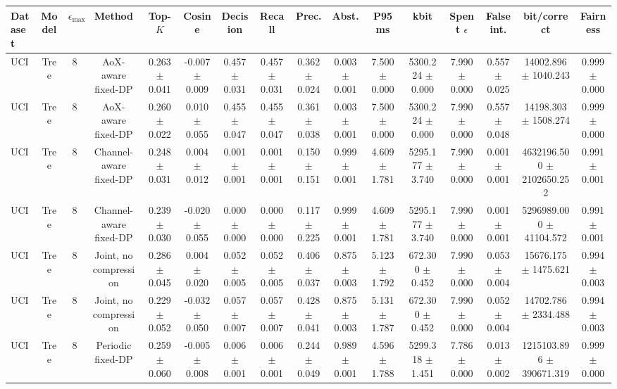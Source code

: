 \begin{tabular}{lccccccccccccccc}
\toprule
Dataset & Model & $\epsilon_{\max}$ & Method & Top-$K$ & Cosine & Decision & Recall & Prec. & Abst. & P95 ms & kbit & Spent $\epsilon$ & False int. & bit/correct & Fairness \\
\midrule
UCI & Tree & 8 & AoX-aware fixed-DP & 0.263 $\pm$ 0.041 & -0.007 $\pm$ 0.009 & 0.457 $\pm$ 0.031 & 0.457 $\pm$ 0.031 & 0.362 $\pm$ 0.024 & 0.003 $\pm$ 0.001 & 7.500 $\pm$ 0.000 & 5300.224 $\pm$ 0.000 & 7.990 $\pm$ 0.000 & 0.557 $\pm$ 0.025 & 14002.896 $\pm$ 1040.243 & 0.999 $\pm$ 0.000 \\
UCI & Tree & 8 & AoX-aware fixed-DP & 0.260 $\pm$ 0.022 & 0.010 $\pm$ 0.055 & 0.455 $\pm$ 0.047 & 0.455 $\pm$ 0.047 & 0.361 $\pm$ 0.038 & 0.003 $\pm$ 0.001 & 7.500 $\pm$ 0.000 & 5300.224 $\pm$ 0.000 & 7.990 $\pm$ 0.000 & 0.557 $\pm$ 0.048 & 14198.303 $\pm$ 1508.274 & 0.999 $\pm$ 0.000 \\
UCI & Tree & 8 & Channel-aware fixed-DP & 0.248 $\pm$ 0.031 & 0.004 $\pm$ 0.012 & 0.001 $\pm$ 0.001 & 0.001 $\pm$ 0.001 & 0.150 $\pm$ 0.151 & 0.999 $\pm$ 0.001 & 4.609 $\pm$ 1.781 & 5295.177 $\pm$ 3.740 & 7.990 $\pm$ 0.000 & 0.001 $\pm$ 0.001 & 4632196.500 $\pm$ 2102650.252 & 0.991 $\pm$ 0.001 \\
UCI & Tree & 8 & Channel-aware fixed-DP & 0.239 $\pm$ 0.030 & -0.020 $\pm$ 0.055 & 0.000 $\pm$ 0.000 & 0.000 $\pm$ 0.000 & 0.117 $\pm$ 0.225 & 0.999 $\pm$ 0.001 & 4.609 $\pm$ 1.781 & 5295.177 $\pm$ 3.740 & 7.990 $\pm$ 0.000 & 0.001 $\pm$ 0.001 & 5296989.000 $\pm$ 41104.572 & 0.991 $\pm$ 0.001 \\
UCI & Tree & 8 & Joint, no compression & 0.286 $\pm$ 0.045 & 0.004 $\pm$ 0.020 & 0.052 $\pm$ 0.005 & 0.052 $\pm$ 0.005 & 0.406 $\pm$ 0.037 & 0.875 $\pm$ 0.003 & 5.123 $\pm$ 1.792 & 672.300 $\pm$ 0.452 & 7.990 $\pm$ 0.000 & 0.053 $\pm$ 0.004 & 15676.175 $\pm$ 1475.621 & 0.994 $\pm$ 0.003 \\
UCI & Tree & 8 & Joint, no compression & 0.229 $\pm$ 0.052 & -0.032 $\pm$ 0.050 & 0.057 $\pm$ 0.007 & 0.057 $\pm$ 0.007 & 0.428 $\pm$ 0.041 & 0.875 $\pm$ 0.003 & 5.131 $\pm$ 1.787 & 672.300 $\pm$ 0.452 & 7.990 $\pm$ 0.000 & 0.052 $\pm$ 0.004 & 14702.786 $\pm$ 2334.488 & 0.994 $\pm$ 0.003 \\
UCI & Tree & 8 & Periodic fixed-DP & 0.259 $\pm$ 0.060 & -0.005 $\pm$ 0.008 & 0.006 $\pm$ 0.001 & 0.006 $\pm$ 0.001 & 0.244 $\pm$ 0.049 & 0.989 $\pm$ 0.001 & 4.596 $\pm$ 1.788 & 5299.318 $\pm$ 1.451 & 7.786 $\pm$ 0.000 & 0.013 $\pm$ 0.002 & 1215103.896 $\pm$ 390671.319 & 0.999 $\pm$ 0.000 \\

\end{tabular}
